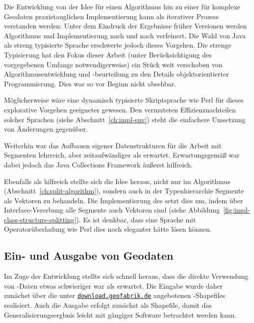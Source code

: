 \documentclass[../main/thesis.tex]{subfiles}
\begin{document}
Die Entwicklung von der Idee für einen Algorithmus hin zu einer für komplexe Geodaten praxistauglichen Implementierung kann als iterativer Prozess verstanden werden:
Unter dem Eindruck der Ergebnisse früher Versionen werden Algorithmus und Implementierung nach und nach verfeinert.
Die Wahl von Java als streng typisierte Sprache erschwerte jedoch dieses Vorgehen.
Die strenge Typisierung hat den Fokus dieser Arbeit (unter Berücksichtigung des vorgegebenen Umfangs notwendigerweise) ein Stück weit verschoben von Algorithmusentwicklung und -beurteilung zu den Details objektorientierter Programmierung.
Dies war so vor Beginn nicht absehbar.

Möglicherweise wäre eine dynamisch typisierte Skriptsprache wie Perl für dieses explorative Vorgehen geeigneter gewesen.
Den vermuteten Effizienznachteilen solcher Sprachen (siehe Abschnitt~\ref{ch:impl-env}) steht die einfachere Umsetzung von Änderungen gegenüber.

Weiterhin war das Aufbauen eigener Datenstrukturen für die Arbeit mit Segmenten lehrreich, aber zeitaufwändiger als erwartet.
Erwartungsgemäß war dabei jedoch das Java Collections Framework äußerst hilfreich.

Ebenfalls als hilfreich stellte sich die Idee heraus, nicht nur im Algorithmus (Abschnitt~\ref{ch:split-algorithm}), sondern auch in der Typenhierarchie Segmente als Vektoren zu behandeln.
Die Implementierung des  setzt dies um, indem über Interface-Vererbung alle Segmente auch Vektoren sind (siehe Abbildung~\ref{fig:impl-class-structure-splitting}).
Es ist denkbar, dass eine Sprache mit Operatorüberladung wie Perl dies noch eleganter hätte lösen können.



\subsection{Ein- und Ausgabe von Geodaten}
\label{ch:impl-io}

Im Zuge der Entwicklung stellte sich schnell heraus, dass die direkte Verwendung von \osm-Daten etwas schwieriger war als erwartet.
Die Eingabe wurde daher zunächst über die unter \href{https://download.geofabrik.de/}{\nolinkurl{download.geofabrik.de}} angebotenen \osm-Shapefiles realisiert.
Auch die Ausgabe erfolgt zunächst als Shapefile, damit das Generalisierungsergbnis leicht mit gängiger Software betrachtet werden kann.
\end{document}
